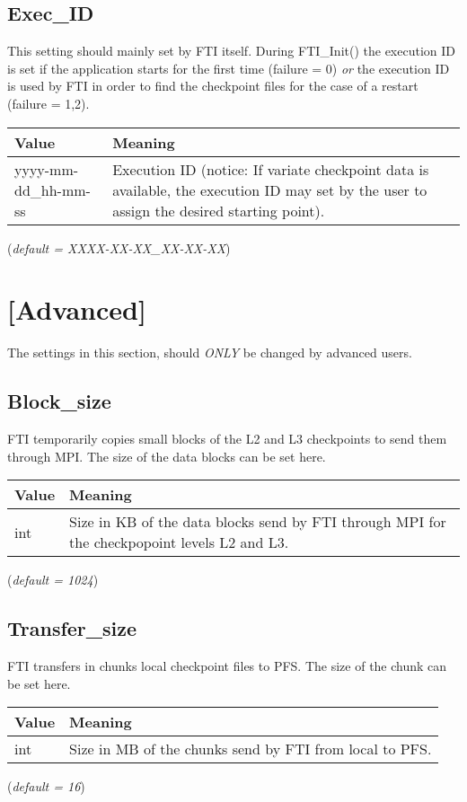 \documentclass{refrep}
\begin{document}
\subsection{Exec\_ID}\label{subsec:execid}
This setting should mainly set by FTI itself. During {\asciifamily FTI\_Init()} the execution ID is set if the application starts for the first time (failure = 0) \emph{or} the execution ID is used by FTI in order to find the checkpoint files for the case of a restart (failure = 1,2).
\begin{center}
\begin{tabular}[h!]{|p{}|p{}|}
\hline
\textbf{Value} & \textbf{Meaning} \\ \hline
yyyy-mm-dd\_hh-mm-ss & Execution ID (notice: If variate checkpoint data is available, the execution ID may set by the user to assign the desired starting point). \\ \hline
\end{tabular}
\end{center}
(\textit{default = XXXX-XX-XX\_XX-XX-XX})
\section{[Advanced]}\label{sec:advanced}
The settings in this section, should \emph{ONLY} be changed by advanced users.
\subsection{Block\_size}\label{subsec:blocksize}
FTI temporarily copies small blocks of the L2 and L3 checkpoints to send them through MPI. The size of the data blocks can be set here.
\begin{center}
\begin{tabular}[h!]{|p{}|p{}|}
\hline
\textbf{Value} & \textbf{Meaning} \\ \hline
int & Size in KB of the data blocks send by FTI through MPI for the checkpopoint levels L2 and L3. \\ \hline
\end{tabular}
\end{center}
(\textit{default = 1024})
\subsection{Transfer\_size}\label{subsec:transfersize}
FTI transfers in chunks local checkpoint files to PFS. The size of the chunk can be set here.
\begin{center}
\begin{tabular}[h!]{|p{}|p{}|}
\hline
\textbf{Value} & \textbf{Meaning} \\ \hline
int & Size in MB of the chunks send by FTI from local to PFS. \\ \hline
\end{tabular}
\end{center}
(\textit{default = 16})
\end{document}

